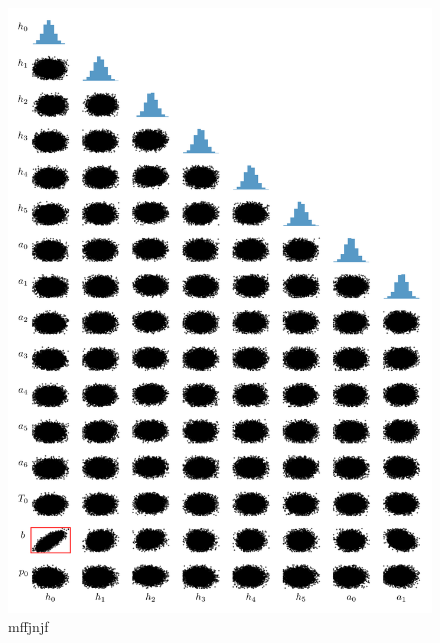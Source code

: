 \begin{figure}[h]%
		\includegraphics[]{CorrPlot.png}
		\caption[Correlation plot of samples from TT-approximation]{mffjnjf}
\end{figure}

